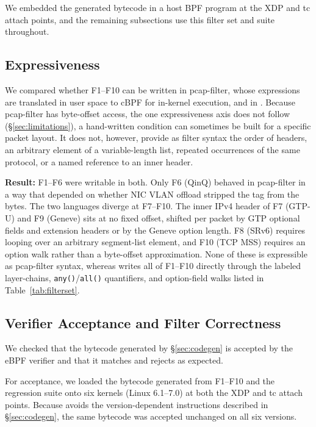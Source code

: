We embedded the generated bytecode in a host BPF program at the XDP
and tc attach points, and the remaining subsections use this filter
set and suite throughout.

\subsection{Expressiveness}
\label{sec:eval-expr}

We compared whether F1--F10 can be written in pcap-filter, whose
expressions are translated in user space to cBPF for in-kernel
execution, and in \kunai. Because pcap-filter
has byte-offset access, the one expressiveness axis \kunai does
not follow (\S\ref{sec:limitations}), a hand-written
condition can sometimes be built for a specific packet layout. It does
not, however, provide as filter syntax the order of headers, an
arbitrary element of a variable-length list, repeated occurrences of
the same protocol, or a named reference to an inner header.

\textbf{Result:} F1--F6 were writable in both. Only
F6 (QinQ) behaved in pcap-filter in a way that depended on whether NIC
VLAN offload stripped the tag from the bytes. The two languages diverge
at F7--F10. The inner IPv4 header of F7 (GTP-U)
and F9 (Geneve) sits at no fixed offset, shifted per packet by GTP
optional fields and extension headers or by the Geneve option length.
F8 (SRv6) requires looping over an arbitrary segment-list element, and
F10 (TCP MSS) requires an option walk rather than a byte-offset
approximation. None of these is expressible as pcap-filter
syntax, whereas \kunai writes all of F1--F10 directly through the
labeled layer-chains, \texttt{any()}/\texttt{all()} quantifiers, and
option-field walks listed in Table~\ref{tab:filterset}.

\subsection{Verifier Acceptance and Filter Correctness}
\label{sec:eval-accept}

We checked that the bytecode generated by \S\ref{sec:codegen} is
accepted by the eBPF verifier and that it matches and rejects as
expected.

For acceptance, we loaded the bytecode generated from F1--F10 and the
regression suite onto six kernels (Linux 6.1--7.0) at both the XDP and
tc attach points. Because \kunai avoids the version-dependent
instructions described in \S\ref{sec:codegen}, the same bytecode was
accepted unchanged on all six versions.


